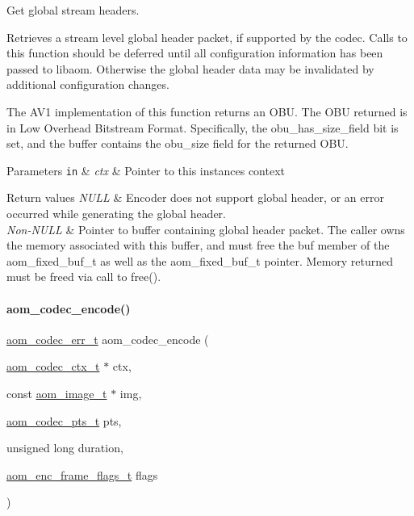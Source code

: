 Get global stream headers. 

Retrieves a stream level global header packet, if supported by the codec. Calls to this function should be deferred until all configuration information has been passed to libaom. Otherwise the global header data may be invalidated by additional configuration changes.

The A\+V1 implementation of this function returns an O\+BU. The O\+BU returned is in Low Overhead Bitstream Format. Specifically, the obu\+\_\+has\+\_\+size\+\_\+field bit is set, and the buffer contains the obu\+\_\+size field for the returned O\+BU.


\begin{DoxyParams}[1]{Parameters}
\mbox{\tt in}  & {\em ctx} & Pointer to this instance\textquotesingle{}s context\\
\hline
\end{DoxyParams}

\begin{DoxyRetVals}{Return values}
{\em N\+U\+LL} & Encoder does not support global header, or an error occurred while generating the global header.\\
\hline
{\em Non-\/\+N\+U\+LL} & Pointer to buffer containing global header packet. The caller owns the memory associated with this buffer, and must free the \textquotesingle{}buf\textquotesingle{} member of the aom\+\_\+fixed\+\_\+buf\+\_\+t as well as the aom\+\_\+fixed\+\_\+buf\+\_\+t pointer. Memory returned must be freed via call to free(). \\
\hline
\end{DoxyRetVals}
\mbox{\label{group__encoder_ga6f4a777de5389771e783df7ff1f116d4}} 
\paragraph{\texorpdfstring{aom\+\_\+codec\+\_\+encode()}{aom\_codec\_encode()}}
{\footnotesize\ttfamily \hyperlink{group__codec_gaaae61e0f8663e6137f1e228757248e7c}{aom\+\_\+codec\+\_\+err\+\_\+t} aom\+\_\+codec\+\_\+encode (\begin{DoxyParamCaption}\item[{\hyperlink{group__codec_ga9a1d27f9742d9f70783e3c6cb849b5b4}{aom\+\_\+codec\+\_\+ctx\+\_\+t} $\ast$}]{ctx,  }\item[{const \hyperlink{aom__image_8h_a5409ae8fdb326fe1cc32622ef4e23748}{aom\+\_\+image\+\_\+t} $\ast$}]{img,  }\item[{\hyperlink{group__encoder_ga958524226c9a65251c9e4f7bb78fc606}{aom\+\_\+codec\+\_\+pts\+\_\+t}}]{pts,  }\item[{unsigned long}]{duration,  }\item[{\hyperlink{group__encoder_gacbef92200b831adb94283f84128f83de}{aom\+\_\+enc\+\_\+frame\+\_\+flags\+\_\+t}}]{flags }\end{DoxyParamCaption})}



